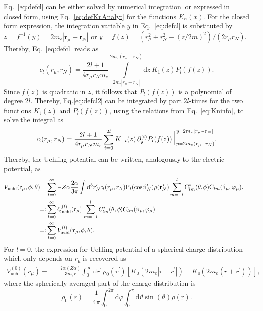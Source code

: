 Eq.~\eqref{eq:defcl} can be either solved by numerical integration, or expressed in closed form, using Eq.~\eqref{eq:defKnAnalyt} for the functions $K_n(x)$. For the closed form expression, the integration variable $y$ in Eq.~\eqref{eq:defcl} is substituted by $z=f^{-1}(y)=2m_e{|\mathbf{r}_\mu - \mathbf{r}_N|}$ or $y=f(z)=(r_\mu^2+r_N^2 -(z/2m)^2)/(2r_\mu r_N)$. Thereby, Eq.~\eqref{eq:defcl} reads as
\begin{equation}
c_l(r_\mu,r_N)=\frac{2l+1}{4 r_\mu r_N m_e}\mathop\int\limits_{2m_e{|r_\mu - r_N|}}^{2m_e{(r_\mu + r_N)}} \text{d}z\, K_1(z)P_l(f(z)).
\label{eq:defcl2}
\end{equation}
Since $f(z)$ is quadratic in $z$, it follows that $P_l(f(z))$ is a polynomial of degree $2l$. Thereby, Eq.\eqref{eq:defcl2} can be integrated by part $2l$-times for the two functions $K_1(z)$ and $P_l(f(z))$, using the relations from Eq.~\eqref{eq:Kninfo}, to solve the integral as
\begin{equation}
c_l(r_\mu,r_N)=\frac{2l+1}{4 r_\mu r_N m_e}
\sum\limits_{i=0}^{2l} K_{-i}(z)\,\partial^{(i)}_yP_l(f(z))\text{\huge |}^{y=2m_e{|r_\mu - r_N|}}_{y=2m_e{(r_\mu + r_N)}}.
\label{eq:defcl3}
\end{equation}
Thereby, the Uehling potential can be written, analogously to the electric potential, as
\begin{align}
V_{\text{uehl}}(\mathbf{r}_\mu,\phi,\theta)=&\sum_{l=0}^\infty-Z\alpha\frac{2\alpha}{3\pi} 
 \int \text{d}^3r^{\prime}_N c_l(r_\mu,r_N)\text{P}_{l}(\cos \vartheta_N^{\prime})\rho(\mathbf{r}_N^{\,\prime})\sum_{m=-l}^l \text{C}^*_{lm}(\theta,\phi)\text{C}_{lm}(\vartheta_\mu,\varphi_\mu).\notag\\
=:&\sum_{l=0}^\infty Q^{(l)}_{\text{uehl}}(r_\mu)\,\sum_{m=-l}^lC^*_{lm}(\theta,\phi)C_{lm}(\vartheta_\mu,\varphi_\mu)&\notag\\
=:& \sum_{l=0}^\infty V^{(l)}_{\text{uehl}}(\mathbf{r}_\mu,\phi,\theta).
\label{eq:defmultiuehl}
\end{align}
For $l=0$, the expression for Uehling potential of a spherical charge distribution~\cite{Fullerton1976} which only depends on $r_\mu$ is recovered as
\begin{align}
\label{eq:sph_uehl}
V^{(0)}_{\text{uehl}}(r_\mu)=& -\frac{2\alpha (Z\alpha)}{3 m_e r}\int_0^\infty \text{d}r^{\prime}\,\rho_0(r^\prime)\left[K_0(2m_e|r-r^\prime|)-K_0(2m_e(r+r^\prime))\right],
\end{align}
where the spherically averaged part of the charge distribution is
\begin{equation}
\rho_0(r)=\frac{1}{4\pi}\int_0^{2\pi}\text{d}\varphi\int_0^\pi\text{d}\vartheta \sin(\vartheta)\rho(\mathbf{r}).
\end{equation}
